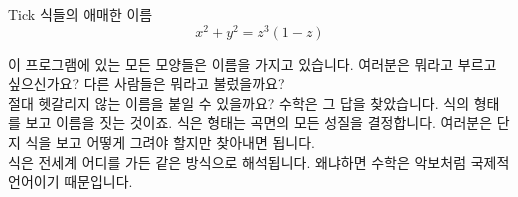 \begin{surferPage}{Tick}
식들의 애매한 이름 \\
\smallskip
\[x^2 + y^2	= z^3	(1 - z) \]


\singlespacing
이 프로그램에 있는 모든 모양들은 이름을 가지고 있습니다. 여러분은 뭐라고 부르고 싶으신가요? 다른 사람들은 뭐라고 불렀을까요?\\
\vspace{0.3cm}
절대 헷갈리지 않는 이름을 붙일 수 있을까요? 수학은 그 답을 찾았습니다. 식의 형태를 보고 이름을 짓는 것이죠. 식은 형태는 곡면의 모든 성질을 결정합니다.  여러분은 단지 식을 보고 어떻게 그려야 할지만 찾아내면 됩니다.\\
\vspace{0.3cm}
식은 전세계 어디를 가든 같은 방식으로 해석됩니다. 왜냐하면 수학은 악보처럼 국제적 언어이기 때문입니다.
\end{surferPage}
